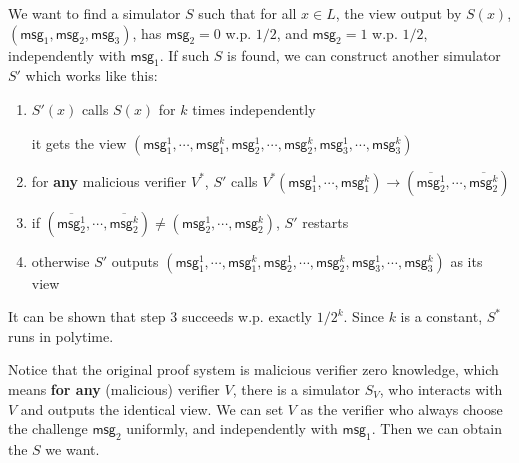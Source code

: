 \documentclass[8pt]{article}
\theoremstyle{compact}
\begin{document}
\def\msg{\textsf{msg}}

We want to find a simulator $S$ such that for all $x \in L$, the view output by $S(x)$, $(\msg_1, \msg_2, \msg_3)$, has $\msg_2 = 0$ w.p. $1/2$, and $\msg_2 = 1$ w.p. $1/2$, independently with $\msg_1$. If such $S$ is found, we can construct another simulator $S'$ which works like this: \begin{enumerate}
	\item $S'(x)$ calls $S(x)$ for $k$ times independently
	
	it gets the view $(\msg_1^1, \cdots, \msg_1^k, \msg_2^1, \cdots, \msg_2^k, \msg_3^1, \cdots, \msg_3^k)$

	\item for \textbf{any} malicious verifier $V^*$, $S'$ calls $V^*(\msg_1^1, \cdots, \msg_1^k) \to (\overline{\msg_2^1}, \cdots, \overline{\msg_2^k})$ 
	\item if $(\overline{\msg_2^1}, \cdots, \overline{\msg_2^k}) \neq (\msg_2^1, \cdots, \msg_2^k)$, $S'$ restarts
	\item otherwise $S'$ outputs $(\msg_1^1, \cdots, \msg_1^k, \msg_2^1, \cdots, \msg_2^k, \msg_3^1, \cdots, \msg_3^k)$ as its view
\end{enumerate}

It can be shown that step 3 succeeds w.p. exactly $1/2^k$. Since $k$ is a constant, $S^*$ runs in polytime.

Notice that the original proof system is malicious verifier zero knowledge, which means \textbf{for any} (malicious) verifier $V$, there is a simulator $S_V$, who interacts with $V$ and outputs the identical view. We can set $V$ as the verifier who always choose the challenge $\msg_2$ uniformly, and independently with $\msg_1$. Then we can obtain the $S$ we want.
\end{document}
